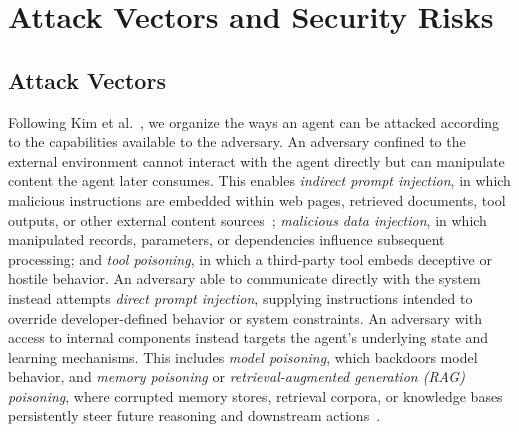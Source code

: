 
\section{Attack Vectors and Security Risks}

\subsection{Attack Vectors}

Following Kim et al.~\cite{kim2026sok}, we organize the ways an agent can be attacked according to the capabilities available to the adversary. An adversary confined to the external environment cannot interact with the agent directly but can manipulate content the agent later consumes. This enables \emph{indirect prompt injection}, in which malicious instructions are embedded within web pages, retrieved documents, tool outputs, or other external content sources~\cite{greshake}; \emph{malicious data injection}, in which manipulated records, parameters, or dependencies influence subsequent processing; and \emph{tool poisoning}, in which a third-party tool embeds deceptive or hostile behavior.
An adversary able to communicate directly with the system instead attempts \emph{direct prompt injection}, supplying instructions intended to override developer-defined behavior or system constraints. An adversary with access to internal components instead targets the agent's underlying state and learning mechanisms. This includes \emph{model poisoning}, which backdoors model behavior, and \emph{memory poisoning} or \emph{retrieval-augmented generation (RAG) poisoning}, where corrupted memory stores, retrieval corpora, or knowledge bases persistently steer future reasoning and downstream actions~\cite{agentpoison,poisonedrag}.


